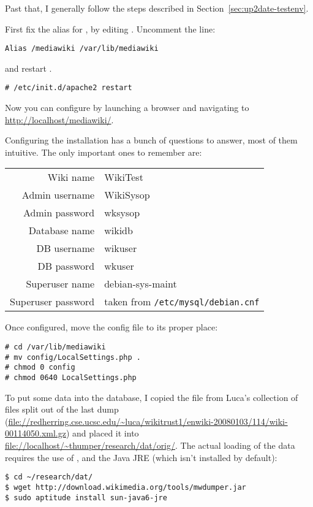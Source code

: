 Past that, I generally follow the steps described in
Section~\ref{sec:up2date-testenv}.

First fix the alias for \mediawiki, by editing
.
Uncomment the line:
\begin{verbatim}
Alias /mediawiki /var/lib/mediawiki
\end{verbatim}
and restart \mediawiki.
\begin{verbatim}
# /etc/init.d/apache2 restart
\end{verbatim}

Now you can configure \mediawiki by launching
a browser and navigating to \url{http://localhost/mediawiki/}.

Configuring the \mediawiki installation has a
bunch of questions to answer, most of them intuitive.
The only important ones to remember are:
\begin{tabular}{|r|l|}
\hline
Wiki name & WikiTest \\
Admin username & WikiSysop \\
Admin password & wksysop \\
Database name & wikidb \\
DB username & wikuser \\
DB password & wkuser \\
Superuser name & debian-sys-maint \\
Superuser password & taken from \texttt{/etc/mysql/debian.cnf} \\
\hline
\end{tabular}
Once configured, move the config file to its proper place:
\begin{verbatim}
# cd /var/lib/mediawiki
# mv config/LocalSettings.php .
# chmod 0 config
# chmod 0640 LocalSettings.php
\end{verbatim}

To put some data into the database, I copied the
file  from Luca's collection
of files split out of the last dump
(\url{file://redherring.cse.ucsc.edu/~luca/wikitrust1/enwiki-20080103/114/wiki-00114050.xml.gz})
and placed it into \url{file://localhost/~thumper/research/dat/orig/}.
The actual loading of the data requires the use of ,
and the Java JRE (which isn't installed by default):
\begin{verbatim}
$ cd ~/research/dat/
$ wget http://download.wikimedia.org/tools/mwdumper.jar
$ sudo aptitude install sun-java6-jre
\end{verbatim}

